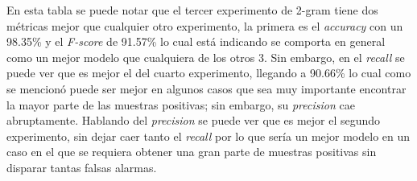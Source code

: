 \par En esta tabla se puede notar que el tercer experimento de 2-gram tiene dos métricas mejor que cualquier otro experimento, la primera es el \textit{accuracy} con un 98.35\% y el \textit{F-score} de 91.57\% lo cual está indicando se comporta en general como un mejor modelo que cualquiera de los otros 3. Sin embargo, en el \textit{recall} se puede ver que es mejor el del cuarto experimento, llegando a 90.66\% lo cual como se mencionó puede ser mejor en algunos casos que sea muy importante encontrar la mayor parte de las muestras positivas; sin embargo, su \textit{precision} cae abruptamente. Hablando del \textit{precision} se puede ver que es mejor el segundo experimento, sin dejar caer tanto el \textit{recall} por lo que sería un mejor modelo en un caso en el que se requiera obtener una gran parte de muestras positivas sin disparar tantas falsas alarmas.

